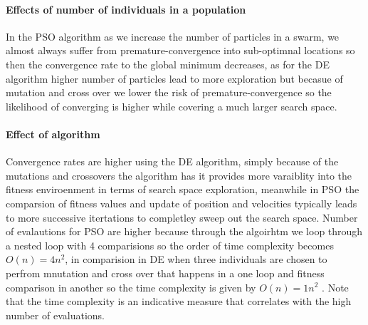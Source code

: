 \documentclass[
]{article}
\begin{document}
\begin{table}[H]
\centering
{}
\end{table}

\hypertarget{effects-of-number-of-individuals-in-a-population}{%
\paragraph{Effects of number of individuals in a
population}\label{effects-of-number-of-individuals-in-a-population}}

In the PSO algorithm as we increase the number of particles in a swarm,
we almost always suffer from premature-convergence into sub-optimnal
locations so then the convergence rate to the global minimum decreases,
as for the DE algorithm higher number of particles lead to more
exploration but becasue of mutation and cross over we lower the risk of
premature-convergence so the likelihood of converging is higher while
covering a much larger search space.

\hypertarget{effect-of-algorithm}{%
\paragraph{Effect of algorithm}\label{effect-of-algorithm}}

Convergence rates are higher using the DE algorithm, simply because of
the mutations and crossovers the algorithm has it provides more
varaiblity into the fitness enviroenment in terms of search space
exploration, meanwhile in PSO the comparsion of fitness values and
update of position and velocities typically leads to more successive
itertations to completley sweep out the search space. Number of
evalautions for PSO are higher because through the algoirhtm we loop
through a nested loop with 4 comparisions so the order of time
complexity becomes \(O(n)=4n^2\), in comparision in DE when three
individuals are chosen to perfrom mnutation and cross over that happens
in a one loop and fitness comparison in another so the time complexity
is given by \(O(n)=1n^2\) . Note that the time complexity is an
indicative measure that correlates with the high number of evaluations.
\end{document}
